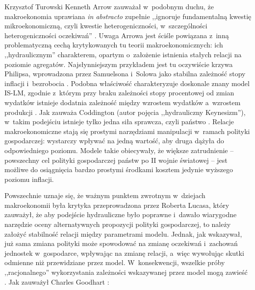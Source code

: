 \begin{artplenv}{Krzysztof Turowski}
Kenneth Arrow zauważał w~podobnym duchu, że makroekonomia uprawiana \textit{in abstracto} zupełnie ,,ignoruje
fundamentalną kwestię mikroekonomiczną, czyli kwestie heterogeniczności, w~szczególności heterogeniczności oczekiwań''
\parencite{colander_changing_2004}.
Uwaga Arrowa jest ściśle powiązana z~inną problematyczną cechą
krytykowanych tu teorii makroekonomicznych: ich ,,hydraulicznym'' charakterem, opartym o~założenie istnienia stałych
relacji na poziomie agregatów. Najsłynniejszym przykładem jest tu oczywiście krzywa Philipsa, wprowadzona przez
Samuelsona i~Solowa jako stabilna zależność stopy inflacji i~bezrobocia
\parencite{samuelson_analytical_1960}.
Podobna właściwość charakteryzuje doskonale znany model IS-LM, zgodnie z~którym przy braku zależności stopy
procentowej od zmian wydatków istnieje dodatnia zależność między wzrostem wydatków a~wzrostem produkcji
\parencite{hicks_mr._1937}.
Jak zauważa Coddington (autor pojęcia ,,hydrauliczny Keynesizm''), w~takim
podejściu istnieje tylko jedna siła sprawcza, czyli państwo
\parencite{coddington_keynesian_1976}.
Relacje
makroekonomiczne stają się prostymi narzędziami manipulacji w~ramach polityki gospodarczej: wystarczy wpływać na jedną
wartość, aby druga dążyła do odpowiedniego poziomu. Modele takie obiecywały, że większe zatrudnienie  -- 
powszechny cel polityki gospodarczej państw po II wojnie światowej
\parencite{robinson_second_1972}
 -- jest możliwe do osiągnięcia bardzo prostymi środkami kosztem jedynie wyższego poziomu inflacji.

Powszechnie uznaje się, że ważnym punktem zwrotnym w~dziejach makroekonomii była krytyka przeprowadzona przez Roberta
Lucasa, który zauważył, że aby podejście hydrauliczne było poprawne i~dawało wiarygodne narzędzie oceny alternatywnych
propozycji polityki gospodarczej, to należy założyć stabilność relacji między parametrami modelu. Jednak, jak
wskazywał, już sama zmiana polityki może spowodować na zmianę oczekiwań i~zachowań jednostek w~gospodarce, wpływając na
zmianę relacji, a~więc wywołując skutki odmienne niż przewidziane przez model. W~konsekwencji, wszelkie próby
,,racjonalnego'' wykorzystania zależności wskazywanej przez model mogą zawieść
\parencite{lucas_econometric_1976}.
Jak zauważył Charles Goodhart
\parencite*[s.~116]{goodhart_problems_1984}:


\end{artplenv}

